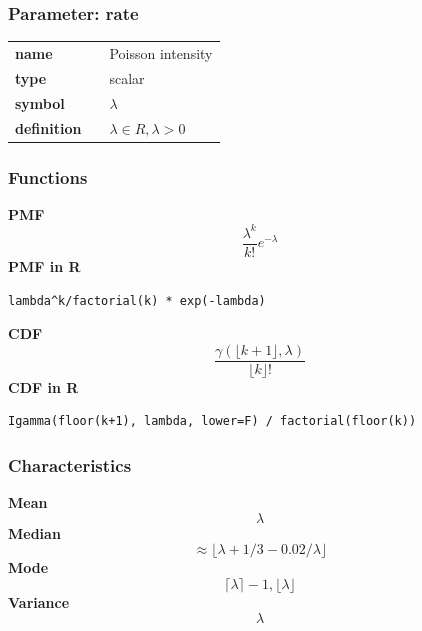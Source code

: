 \subsubsection*{Parameter: rate}

\noindent\begin{tabular}{p{2cm}cl}
\textbf{name} & & Poisson intensity \\
\textbf{type} & & scalar \\
\textbf{symbol} & & $\lambda$  \\
\textbf{definition} & & $\lambda \in R, \lambda > 0$
\end{tabular}
\subsubsection*{Functions}

\smallskip \noindent \hspace{.2cm} \textbf{PMF} 
\begin{equation*}\frac{\lambda^k}{k!}e^{-\lambda}\end{equation*}
\smallskip \noindent \hspace{.2cm} \textbf{PMF in R}  
\begin{verbatim}lambda^k/factorial(k) * exp(-lambda)\end{verbatim}
\smallskip \noindent \hspace{.2cm} \textbf{CDF} 
\begin{equation*}\frac{\gamma(\lfloor k+1 \rfloor,\lambda)}{\lfloor k \rfloor!}\end{equation*}
\smallskip \noindent \hspace{.2cm} \textbf{CDF in R} 
\begin{verbatim}Igamma(floor(k+1), lambda, lower=F) / factorial(floor(k))\end{verbatim}
\smallskip
\subsubsection*{Characteristics}
\smallskip \noindent \hspace{.2cm} \textbf{Mean} 
\begin{equation*}\lambda\end{equation*}
\smallskip \noindent \hspace{.2cm} \textbf{Median} 
\begin{equation*}\approx\lfloor\lambda+1/3-0.02/\lambda\rfloor\end{equation*}
\smallskip \noindent \hspace{.2cm} \textbf{Mode} 
\begin{equation*}\lceil\lambda\rceil - 1, \lfloor\lambda\rfloor\end{equation*}
\smallskip \noindent \hspace{.2cm} \textbf{Variance} 
\begin{equation*}\lambda\end{equation*}
\smallskip
